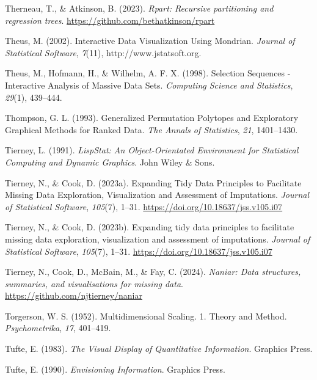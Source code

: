 \documentclass[
  letterpaper,
]{krantz}
\newlength{\cslhangindent}
\newenvironment{CSLReferences}[2] %
 {\begin{list}{}{%
  \setlength{\itemindent}{0pt}
  \setlength{\leftmargin}{0pt}
  \setlength{\parsep}{0pt}
  \ifodd #1
   \setlength{\leftmargin}{\cslhangindent}
   \setlength{\itemindent}{-1\cslhangindent}
  \fi
  \setlength{\itemsep}{#2\baselineskip}}}
 {\end{list}}
\begin{document}
\begin{CSLReferences}{1}{0}
Therneau, T., \& Atkinson, B. (2023). \emph{Rpart: Recursive
partitioning and regression trees}.
\url{https://github.com/bethatkinson/rpart}

Theus, M. (2002). Interactive {D}ata {V}isualization {U}sing {M}ondrian.
\emph{Journal of Statistical Software}, \emph{7}(11),
http://www.jstatsoft.org.

Theus, M., Hofmann, H., \& Wilhelm, A. F. X. (1998). Selection
{S}equences - {I}nteractive {A}nalysis of {M}assive {D}ata {S}ets.
\emph{Computing Science and Statistics}, \emph{29}(1), 439--444.

Thompson, G. L. (1993). Generalized {P}ermutation {P}olytopes and
{E}xploratory {G}raphical {M}ethods for {R}anked {D}ata. \emph{The
Annals of Statistics}, \emph{21}, 1401--1430.

Tierney, L. (1991). \emph{{L}isp{S}tat: {A}n {O}bject-{O}rientated
{E}nvironment for {S}tatistical {C}omputing and {D}ynamic {G}raphics}.
John Wiley \& Sons.

Tierney, N., \& Cook, D. (2023a). Expanding {T}idy {D}ata {P}rinciples
to {F}acilitate {M}issing {D}ata {E}xploration, {V}isualization and
{A}ssessment of {I}mputations. \emph{Journal of Statistical Software},
\emph{105}(7), 1--31. \url{https://doi.org/10.18637/jss.v105.i07}

Tierney, N., \& Cook, D. (2023b). Expanding tidy data principles to
facilitate missing data exploration, visualization and assessment of
imputations. \emph{Journal of Statistical Software}, \emph{105}(7),
1--31. \url{https://doi.org/10.18637/jss.v105.i07}

Tierney, N., Cook, D., McBain, M., \& Fay, C. (2024). \emph{Naniar: Data
structures, summaries, and visualisations for missing data}.
\url{https://github.com/njtierney/naniar}

Torgerson, W. S. (1952). Multidimensional {S}caling. 1. {T}heory and
{M}ethod. \emph{Psychometrika}, \emph{17}, 401--419.

Tufte, E. (1983). \emph{The {V}isual {D}isplay of {Q}uantitative
{I}nformation}. Graphics Press.

Tufte, E. (1990). \emph{Envisioning {I}nformation}. Graphics Press.


\end{CSLReferences}
\end{document}
